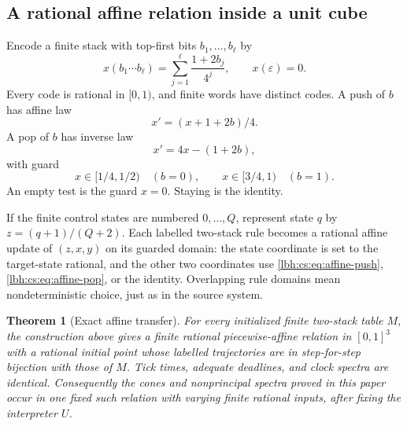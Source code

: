 \documentclass[11pt,letterpaper]{article}
\newtheorem{theorem}{Theorem}[section]
\theoremstyle{definition}
\theoremstyle{remark}
\newcommand{\1}{\mathbf 1}
\begin{document}
\subsection{A rational affine relation inside a unit cube}
Encode a finite stack with top-first bits $b_1,\ldots,b_\ell$ by
\begin{equation}\label{lbh:cs:eq:realcode}
 x(b_1\cdots b_\ell)=\sum_{j=1}^{\ell}\frac{1+2b_j}{4^j},
 \qquad x(\varepsilon)=0.
\end{equation}
Every code is rational in $[0,1)$, and finite words have distinct codes.
A push of $b$ has affine law
\begin{equation}\label{lbh:cs:eq:affine-push}
 x'=(x+1+2b)/4.
\end{equation}
A pop of $b$ has inverse law
\begin{equation}\label{lbh:cs:eq:affine-pop}
 x'=4x-(1+2b),
\end{equation}
with guard
\[
 x\in[1/4,1/2)\quad(b=0),\qquad
 x\in[3/4,1)\quad(b=1).
\]
An empty test is the guard $x=0$. Staying is the identity.

If the finite control states are numbered $0,\ldots,Q$, represent state
$q$ by $z=(q+1)/(Q+2)$. Each labelled two-stack rule becomes a rational
affine update of $(z,x,y)$ on its guarded domain: the state coordinate is
set to the target-state rational, and the other two coordinates use
\eqref{lbh:cs:eq:affine-push}, \eqref{lbh:cs:eq:affine-pop}, or the identity. Overlapping
rule domains mean nondeterministic choice, just as in the source system.

\begin{theorem}[Exact affine transfer]\label{lbh:cs:thm:affine}
For every initialized finite two-stack table $M$, the construction above
gives a finite rational piecewise-affine relation in $[0,1]^3$ with a
rational initial point whose labelled trajectories are in step-for-step
bijection with those of $M$. Tick times, adequate deadlines, and clock
spectra are identical. Consequently the cones and nonprincipal spectra
proved in this paper occur in one fixed such relation with varying
finite rational inputs, after fixing the interpreter $U$.
\end{theorem}
\end{document}
